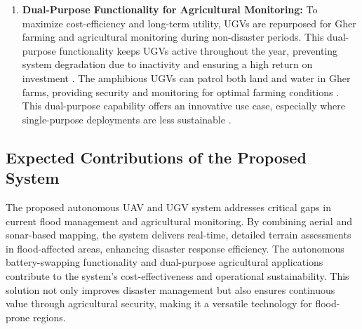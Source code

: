 \documentclass[conference]{IEEEtran}
\begin{document}
\begin{enumerate}
	\item \textbf{Dual-Purpose Functionality for Agricultural Monitoring:}
To maximize cost-efficiency and long-term utility, UGVs are repurposed for Gher farming and agricultural monitoring during non-disaster periods. This dual-purpose functionality keeps UGVs active throughout the year, preventing system degradation due to inactivity and ensuring a high return on investment \cite{ref12}. The amphibious UGVs can patrol both land and water in Gher farms, providing security and monitoring for optimal farming conditions \cite{ref13}. This dual-purpose capability offers an innovative use case, especially where single-purpose deployments are less sustainable \cite{ref14}.
	
\end{enumerate}


\subsection{\textbf{Expected Contributions of the Proposed System}}
The proposed autonomous UAV and UGV system addresses critical gaps in current flood management and agricultural monitoring. By combining aerial and sonar-based mapping, the system delivers real-time, detailed terrain assessments in flood-affected areas, enhancing disaster response efficiency. The autonomous battery-swapping functionality and dual-purpose agricultural applications contribute to the system’s cost-effectiveness and operational sustainability. This solution not only improves disaster management but also ensures continuous value through agricultural security, making it a versatile technology for flood-prone regions.
\end{document}
